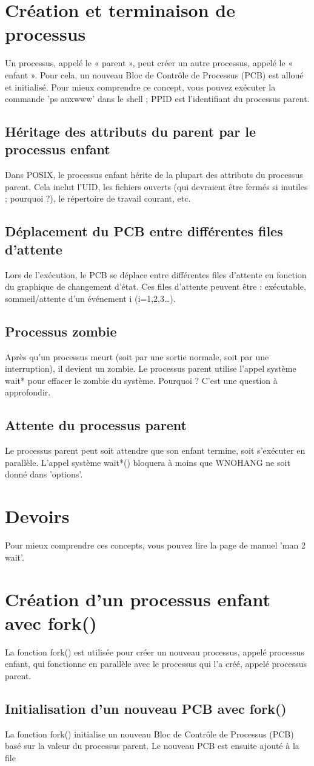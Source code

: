 \documentclass[12pt]{report}
\begin{document}
\section{Création et terminaison de processus}Un processus, appelé le « parent », peut créer un autre processus, appelé le « enfant ». Pour cela, un nouveau Bloc de Contrôle de Processus (PCB) est alloué et initialisé. Pour mieux comprendre ce concept, vous pouvez exécuter la commande 'ps auxwww' dans le shell ; PPID est l'identifiant du processus parent. \subsection{Héritage des attributs du parent par le processus enfant}Dans POSIX, le processus enfant hérite de la plupart des attributs du processus parent. Cela inclut l'UID, les fichiers ouverts (qui devraient être fermés si inutiles ; pourquoi ?), le répertoire de travail courant, etc. \subsection{Déplacement du PCB entre différentes files d'attente}Lors de l'exécution, le PCB se déplace entre différentes files d'attente en fonction du graphique de changement d'état. Ces files d'attente peuvent être : exécutable, sommeil/attente d'un événement i (i=1,2,3…). \subsection{Processus zombie}Après qu'un processus meurt (soit par une sortie normale, soit par une interruption), il devient un zombie. Le processus parent utilise l'appel système wait* pour effacer le zombie du système. Pourquoi ? C'est une question à approfondir. \subsection{Attente du processus parent}Le processus parent peut soit attendre que son enfant termine, soit s'exécuter en parallèle. L'appel système wait*() bloquera à moins que WNOHANG ne soit donné dans 'options'. \section{Devoirs}Pour mieux comprendre ces concepts, vous pouvez lire la page de manuel 'man 2 wait'. \section{Création d'un processus enfant avec fork()}La fonction fork() est utilisée pour créer un nouveau processus, appelé processus enfant, qui fonctionne en parallèle avec le processus qui l'a créé, appelé processus parent. \subsection{Initialisation d'un nouveau PCB avec fork()}La fonction fork() initialise un nouveau Bloc de Contrôle de Processus (PCB) basé sur la valeur du processus parent. Le nouveau PCB est ensuite ajouté à la file 
\end{document}
